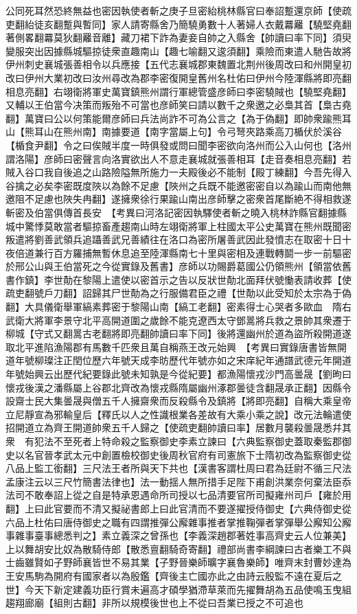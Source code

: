 公同死耳然恐終無益也密因執使者斬之庚子旦密紿桃林縣官曰奉詔蹔還京師【使疏吏翻紿徒亥翻蹔與暫同】家人請寄縣舍乃簡驍勇數十人著婦人衣戴羃䍦【驍堅堯翻著側畧翻羃莫狄翻䍦音離】藏刀裙下詐為妻妾自帥之入縣舍【帥讀曰率下同】須臾變服突出因據縣城驅掠徒衆直趣南山【趣七喻翻又逡須翻】乘險而東遣人馳告故將伊州刺史襄城張善相令以兵應接【五代志襄城郡東魏置北荆州後周改曰和州開皇初改曰伊州大業初改曰汝州尋改為郡李密復開皇舊州名杜佑曰伊州今陸渾縣將即亮翻相息亮翻】右翊衛將軍史萬寶鎮熊州謂行軍總管盛彦師曰李密驍賊也【驍堅堯翻】又輔以王伯當今决策而叛殆不可當也彦師笑曰請以數千之衆邀之必梟其首【梟古堯翻】萬寶曰公以何策能爾彦師曰兵法尚詐不可為公言之【為于偽翻】即帥衆踰熊耳山【熊耳山在熊州南】南據要道【南字當屬上句】令弓弩夾路乘高刀楯伏於溪谷【楯食尹翻】令之曰俟賊半度一時俱發或問曰聞李密欲向洛州而公入山何也【洛州謂洛陽】彦師曰密聲言向洛實欲出人不意走襄城就張善相耳【走音奏相息亮翻】若賊入谷口我自後追之山路險隘無所施力一夫殿後必不能制【殿丁練翻】今吾先得入谷擒之必矣李密既度陜以為餘不足慮【陜州之兵既不能邀密密自以為踰山而南他無邀阻不足慮也陜失冉翻】遂擁衆徐行果踰山南出彦師擊之密衆首尾斷絶不得相救遂斬密及伯當俱傳首長安　【考異曰河洛記密因執驛使者斬之曉入桃林詐縣官翻據縣城中驚悸莫敢當者驅掠畜產趨南山時左翊衛將軍上柱國太平公史萬寶在熊州既聞密叛遣將劉善武領兵追躡善武兄善績往在洛口為密所屠善武因此發憤志在取密十日十夜倍道兼行百方羅捕無暫休息追至陸渾縣南七十里與密相及連戰轉鬬一步一前驅密於邢公山與王伯當死之今從實錄及舊書】彦師以功賜爵葛國公仍領熊州【領當依舊書作鎮】李世勣在黎陽上遣使以密首示之告以反狀世勣北面拜伏號慟表請收葬【使疏吏翻號戶刀翻】詔歸其尸世勣為之行服備君臣之禮【世勣以此受知於太宗為于偽翻】大具儀衛舉軍縞素葬密于黎陽山南【縞工老翻】密素得士心哭者多歐血　隋右武衛大將軍李景守北平高開道圍之歲餘不能克遼西太守鄧暠將兵救之景帥其衆遷于柳城【守式又翻暠古老翻將即亮翻帥讀曰率下同】後將還幽州於道為盜所殺開道遂取北平進陷漁陽郡有馬數千匹衆且萬自稱燕王改元始興　【考異曰實錄唐書皆無開道年號柳璨注正閏位歷六年號天成李昉歷代年號亦如之宋庠紀年通譜武德元年開道年號始興云出歷代紀要錄此號未知孰是今從紀要】都漁陽懷戎沙門高曇晟【劉昫曰懷戎後漢之潘縣屬上谷郡北齊改為懷戎縣隋屬幽州涿郡曇徒含翻晟承正翻】因縣令設齋士民大集曇晟與僧五千人擁齋衆而反殺縣令及鎮將【將即亮翻】自稱大乘皇帝立尼靜宣為邪輸皇后【釋氏以人之性識根業各差故有大乘小乘之說】改元法輪遣使招開道立為齊王開道帥衆五千人歸之【使疏吏翻帥讀曰率】居數月襲殺曇晟悉幷其衆　有犯法不至死者上特命殺之監察御史李素立諫曰【六典監察御史蓋取秦監郡御史以名官晉孝武太元中創置檢校御史後周秋官府有司憲旅下士隋初改為監察御史從八品上監工銜翻】三尺法王者所與天下共也【漢書客謂杜周曰君為廷尉不循三尺法孟康注云以三尺竹簡書法律也】法一動揺人無所措手足陛下甫創洪業奈何棄法臣忝法司不敢奉詔上從之自是特承恩遇命所司授以七品清要官所司擬雍州司戶【雍於用翻】上曰此官要而不清又擬祕書郎上曰此官清而不要遂擢授侍御史【六典侍御史從六品上杜佑曰唐侍御史之職有四謂推彈公廨雜事推者掌推鞠彈者掌彈舉公廨知公廨事雜事臺事總悉判之】素立義深之曾孫也【李義深趙郡著姓事高齊史云人位兼美】上以舞胡安比奴為散騎侍郎【散悉亶翻騎奇寄翻】禮部尚書李綱諫曰古者樂工不與士齒雖賢如子野師襄皆世不易其業【子野晉樂師曠字襄魯樂師】唯齊末封曹妙達為王安馬駒為開府有國家者以為殷鑑【齊後主亡國亦此之由詩云殷監不遠在夏后之世】今天下新定建義功臣行賞未遍高才碩學猶滯草萊而先擢舞胡為五品使鳴玉曳組趨翔廊廟【組則古翻】非所以規模後世也上不從曰吾業已授之不可追也

